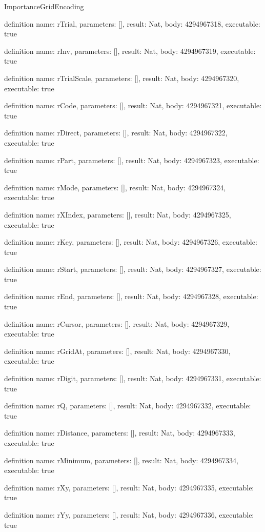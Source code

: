 \begin{lexlean}{ImportanceGridEncoding}
\begin{semanticmodule}
definition{
  name: rTrial,
  parameters: [],
  result: Nat,
  body: 4294967318,
  executable: true
}

definition{
  name: rInv,
  parameters: [],
  result: Nat,
  body: 4294967319,
  executable: true
}

definition{
  name: rTrialScale,
  parameters: [],
  result: Nat,
  body: 4294967320,
  executable: true
}

definition{
  name: rCode,
  parameters: [],
  result: Nat,
  body: 4294967321,
  executable: true
}

definition{
  name: rDirect,
  parameters: [],
  result: Nat,
  body: 4294967322,
  executable: true
}

definition{
  name: rPart,
  parameters: [],
  result: Nat,
  body: 4294967323,
  executable: true
}

definition{
  name: rMode,
  parameters: [],
  result: Nat,
  body: 4294967324,
  executable: true
}

definition{
  name: rXIndex,
  parameters: [],
  result: Nat,
  body: 4294967325,
  executable: true
}

definition{
  name: rKey,
  parameters: [],
  result: Nat,
  body: 4294967326,
  executable: true
}

definition{
  name: rStart,
  parameters: [],
  result: Nat,
  body: 4294967327,
  executable: true
}

definition{
  name: rEnd,
  parameters: [],
  result: Nat,
  body: 4294967328,
  executable: true
}

definition{
  name: rCursor,
  parameters: [],
  result: Nat,
  body: 4294967329,
  executable: true
}

definition{
  name: rGridAt,
  parameters: [],
  result: Nat,
  body: 4294967330,
  executable: true
}

definition{
  name: rDigit,
  parameters: [],
  result: Nat,
  body: 4294967331,
  executable: true
}

definition{
  name: rQ,
  parameters: [],
  result: Nat,
  body: 4294967332,
  executable: true
}

definition{
  name: rDistance,
  parameters: [],
  result: Nat,
  body: 4294967333,
  executable: true
}

definition{
  name: rMinimum,
  parameters: [],
  result: Nat,
  body: 4294967334,
  executable: true
}

definition{
  name: rXy,
  parameters: [],
  result: Nat,
  body: 4294967335,
  executable: true
}

definition{
  name: rYy,
  parameters: [],
  result: Nat,
  body: 4294967336,
  executable: true
}


\end{semanticmodule}
\end{lexlean}
